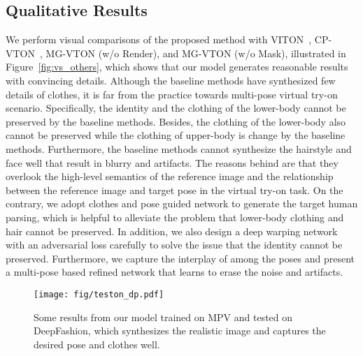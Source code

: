 \documentclass[10pt,twocolumn,letterpaper]{article}
\begin{document}
\subsection{Qualitative Results}
We perform visual comparisons of the proposed method with VITON~\cite{han2017viton}, CP-VTON~\cite{wang2018cpvton}, MG-VTON (w/o Render), and MG-VTON (w/o Mask), illustrated in Figure~\ref{fig:vs_others}, which shows that our model generates reasonable results with convincing details. Although the baseline methods have synthesized few details of clothes, it is far from the practice towards multi-pose virtual try-on scenario. Specifically, the identity and the clothing of the lower-body cannot be preserved by the baseline methods. Besides, the clothing of the lower-body also cannot be preserved while the clothing of upper-body is change by the baseline methods. Furthermore, the baseline methods cannot synthesize the hairstyle and face well that result in blurry and artifacts. The reasons behind are that they overlook the high-level semantics of the reference image and the relationship between the reference image and target pose in the virtual try-on task. On the contrary, we adopt clothes and pose guided network to generate the target human parsing, which is helpful to alleviate the problem that lower-body clothing and hair cannot be preserved. In addition, we also design a deep warping network with an adversarial loss carefully to solve the issue that the identity cannot be preserved. Furthermore, we capture the interplay of among the poses and present a multi-pose based refined network that learns to erase the noise and artifacts. 

\begin{figure}[!hp]
\centering
\texttt{[image: fig/teston\_dp.pdf]} 
\caption{Some results from our model trained on MPV and tested on DeepFashion, which synthesizes the realistic image and captures the desired pose and clothes well.}
\label{fig:teston_dp}
\vspace{-4mm}
\end{figure}



\begin{table}[h]
\centering
\caption{Pairwise comparison on MPV and DeepFashion. Each cell lists the percentage where our MG-VTON is preferred over the other method. Chance is at 50\%. }
\vspace{2mm}
\label{tab:amt}
\vspace{-4mm}
\end{table}
\end{document}
